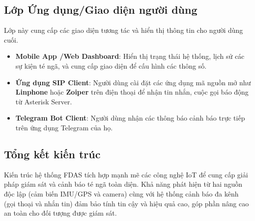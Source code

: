\subsection{Lớp Ứng dụng\slash Giao diện người dùng}
Lớp này cung cấp các giao diện tương tác và hiển thị thông tin cho người dùng cuối.
\begin{itemize}
    \item \textbf{Mobile App \slash Web Dashboard}: Hiển thị trạng thái hệ thống, lịch sử các sự kiện té ngã, và cung cấp giao diện để cấu hình các thông số.
    \item \textbf{Ứng dụng SIP Client}: Người dùng cài đặt các ứng dụng mã nguồn mở như \textbf{Linphone} hoặc \textbf{Zoiper} trên điện thoại để nhận tin nhắn, cuộc gọi báo động từ Asterisk Server.
    \item \textbf{Telegram Bot Client}: Người dùng nhận các thông báo cảnh báo trực tiếp trên ứng dụng Telegram của họ.
\end{itemize}

\subsection{Tổng kết kiến trúc}
Kiến trúc hệ thống FDAS tích hợp mạnh mẽ các công nghệ IoT để cung cấp giải pháp giám sát và cảnh báo té ngã toàn diện. Khả năng phát hiện từ hai nguồn độc lập (cảm biến IMU\slash GPS và camera) cùng với hệ thống cảnh báo đa kênh (gọi thoại và nhắn tin) đảm bảo tính tin cậy và hiệu quả cao, góp phần nâng cao an toàn cho đối tượng được giám sát.
